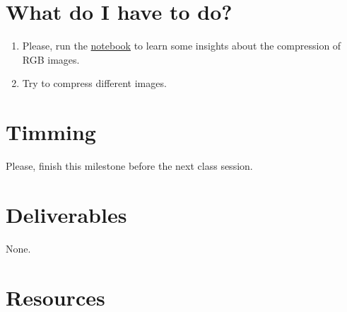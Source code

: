 
\section{What do I have to do?}

\begin{enumerate}
\item Please, run the
  \href{https://github.com/Sistemas-Multimedia/Sistemas-Multimedia.github.io/blob/master/contents/RGB_quantization/RD_performance.ipynb}{notebook}
  to learn some insights about the compression of RGB images.
\item Try to compress different images.
\end{enumerate}

\section{Timming}

Please, finish this milestone before the next class session.

\section{Deliverables}

None.

\section{Resources}

\renewcommand{\addcontentsline}[3]{}%

